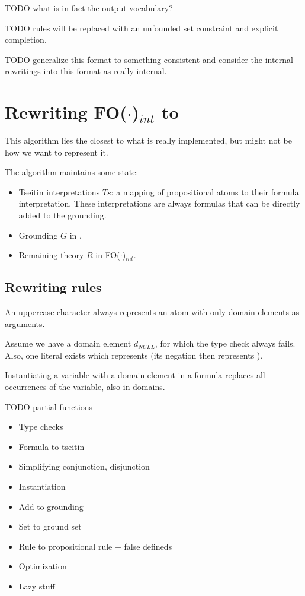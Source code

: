 \documentclass{article}
\newcommand{\indot}{{\sc FO($\cdot$)$_{int}$}\xspace}
\begin{document}
TODO what is in fact the output vocabulary?

TODO rules will be replaced with an unfounded set constraint and explicit completion.

TODO generalize this format to something consistent and consider the internal rewritings into this format as really internal.

\section{Rewriting \indot to \pcdot}
This algorithm lies the closest to what is really implemented, but might not be how we want to represent it.

The algorithm maintains some state:
\begin{itemize}
  \item Tseitin interpretations $Ts$: a mapping of propositional atoms to their formula interpretation. These interpretations are always formulas that can be directly added to the grounding.
	\item Grounding $G$ in \pcdot.
	\item Remaining theory $R$ in \indot.
\end{itemize}

\subsection{Rewriting rules}
An uppercase character always represents an atom with only domain elements as arguments.

Assume we have a domain element $d_{NULL}$, for which the type check always fails. Also, one literal exists which represents \true (its negation then represents \false).

Instantiating a variable with a domain element in a formula replaces all occurrences of the variable, also in domains. 

TODO partial functions

\begin{itemize}
  \item Type checks
  \item Formula to tseitin
  \item Simplifying conjunction, disjunction
  \item Instantiation
  \item Add to grounding
  \item Set to ground set
  \item Rule to propositional rule + false defineds
  \item Optimization
  \item Lazy stuff
\end{itemize}
\end{document}
